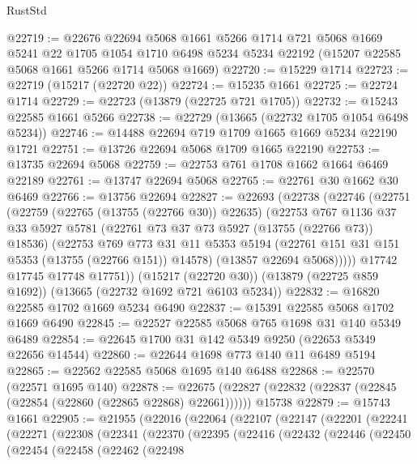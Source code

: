 \begin{lexlean}{RustStd}
\begin{coremodule}
@22719 := @22676
    @22694
    @5068
    @1661
    @5266
    @1714
    @721
    @5068
    @1669
    @5241
    @22
    @1705
    @1054
    @1710
    @6498
    @5234
    @5234
    @22192
    (@15207 @22585 @5068 @1661 @5266 @1714 @5068 @1669)
@22720 := @15229 @1714
@22723 := @22719 (@15217 (@22720 @22))
@22724 := @15235 @1661
@22725 := @22724 @1714
@22729 := @22723 (@13879 (@22725 @721 @1705))
@22732 := @15243 @22585 @1661 @5266
@22738 := @22729 (@13665 (@22732 @1705 @1054 @6498 @5234))
@22746 := @14488 @22694 @719 @1709 @1665 @1669 @5234 @22190 @1721
@22751 := @13726 @22694 @5068 @1709 @1665 @22190
@22753 := @13735 @22694 @5068
@22759 := @22753 @761 @1708 @1662 @1664 @6469 @22189
@22761 := @13747 @22694 @5068
@22765 := @22761 @30 @1662 @30 @6469
@22766 := @13756 @22694
@22827 := @22693
    (@22738
      (@22746
        (@22751
          (@22759
            (@22765 (@13755 (@22766 @30)) @22635)
            (@22753
              @767
              @1136
              @37
              @33
              @5927
              @5781
              (@22761 @73 @37 @73 @5927 (@13755 (@22766 @73)) @18536)
              (@22753
                @769
                @773
                @31
                @11
                @5353
                @5194
                (@22761 @151 @31 @151 @5353 (@13755 (@22766 @151)) @14578)
                (@13857 @22694 @5068)))))
        @17742
        @17745
        @17748
        @17751))
    (@15217 (@22720 @30))
    (@13879 (@22725 @859 @1692))
    (@13665 (@22732 @1692 @721 @6103 @5234))
@22832 := @16820 @22585 @1702 @1669 @5234 @6490
@22837 := @15391 @22585 @5068 @1702 @1669 @6490
@22845 := @22527 @22585 @5068 @765 @1698 @31 @140 @5349 @6489
@22854 := @22645 @1700 @31 @142 @5349 @9250 (@22653 @5349 @22656 @14544)
@22860 := @22644 @1698 @773 @140 @11 @6489 @5194
@22865 := @22562 @22585 @5068 @1695 @140 @6488
@22868 := @22570 (@22571 @1695 @140)
@22878 := @22675 (@22827 (@22832 (@22837 (@22845 (@22854 (@22860 (@22865 @22868) @22661)))))) @15738
@22879 := @15743 @1661
@22905 := @21955
    (@22016
      (@22064
        (@22107
          (@22147
            (@22201
              (@22241
                (@22271
                  (@22308
                    (@22341
                      (@22370
                        (@22395
                          (@22416
                            (@22432
                              (@22446
                                (@22450
                                  (@22454
                                    (@22458
                                      (@22462
                                        (@22498

\end{coremodule}
\end{lexlean}
